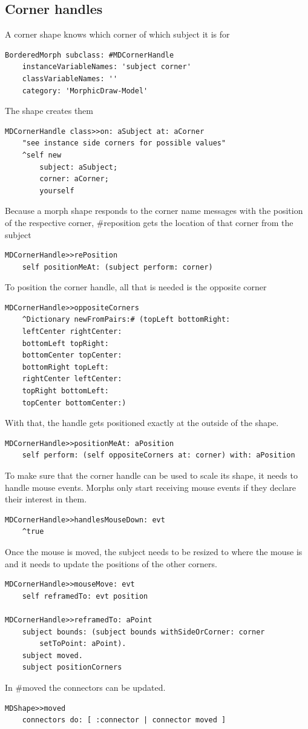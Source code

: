 \documentclass[10pt, twoside]{article}   	%
\begin{document}
\subsection{Corner handles}
A corner shape knows which corner of which subject it is for
\begin{verbatim}
BorderedMorph subclass: #MDCornerHandle
	instanceVariableNames: 'subject corner'
	classVariableNames: ''
	category: 'MorphicDraw-Model'
\end{verbatim}
The shape creates them
\begin{verbatim}
MDCornerHandle class>>on: aSubject at: aCorner
    "see instance side corners for possible values"
    ^self new
        subject: aSubject;
        corner: aCorner;
        yourself
\end{verbatim}
Because a morph shape responds to the corner name messages with
the position of the respective corner, \#reposition gets the location of
that corner from the subject
\begin{verbatim}
MDCornerHandle>>rePosition
    self positionMeAt: (subject perform: corner)
\end{verbatim}
To position the corner handle, all that is needed is the opposite
corner
\begin{verbatim}
MDCornerHandle>>oppositeCorners
    ^Dictionary newFromPairs:# (topLeft bottomRight: 
    leftCenter rightCenter: 
    bottomLeft topRight: 
    bottomCenter topCenter:
    bottomRight topLeft: 
    rightCenter leftCenter:
    topRight bottomLeft:
    topCenter bottomCenter:)
\end{verbatim} 
With that, the handle gets positioned exactly at the outside 
of the shape.
\begin{verbatim}
MDCornerHandle>>positionMeAt: aPosition
    self perform: (self oppositeCorners at: corner) with: aPosition
\end{verbatim}
To make sure that the corner handle can be used to scale its shape,
it needs to handle mouse events. Morphs only start receiving mouse
events if they declare their interest in them.
\begin{verbatim}
MDCornerHandle>>handlesMouseDown: evt
    ^true
\end{verbatim}
Once the mouse is moved, the subject needs to be resized to where
the mouse is and it needs to update the positions of the other corners.  
\begin{verbatim}
MDCornerHandle>>mouseMove: evt
    self reframedTo: evt position

MDCornerHandle>>reframedTo: aPoint	
    subject bounds: (subject bounds withSideOrCorner: corner 
        setToPoint: aPoint).
    subject moved.
    subject positionCorners
\end{verbatim}
In \#moved the connectors can be updated.
\begin{verbatim}
MDShape>>moved
	connectors do: [ :connector | connector moved ]
\end{verbatim}
\end{document}
